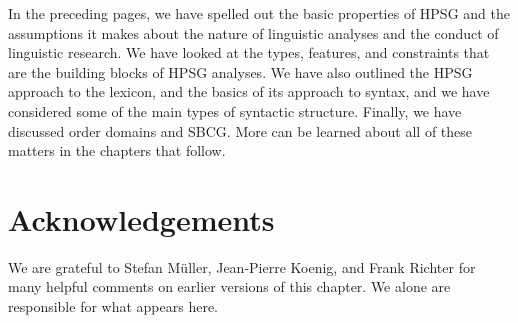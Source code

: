 \documentclass[output=paper
	        ,collection
	        ,collectionchapter
 	        ,biblatex
                ,babelshorthands
                ,newtxmath
                ,draftmode
                ,colorlinks, citecolor=brown
]{langscibook}
\begin{document}
In the preceding pages, we have spelled out the basic properties of HPSG and the assumptions it makes about the nature of linguistic analyses and the conduct of linguistic research. We have looked at the types, features, and constraints that are the building blocks of HPSG analyses. We have also outlined the HPSG approach to the lexicon, and the basics of its approach to syntax, and we have considered some of the main types of syntactic structure. Finally, we have discussed order domains and SBCG. More can be learned about all of these matters in the chapters that follow.


\section*{Acknowledgements}

We are grateful to Stefan Müller, Jean-Pierre Koenig, and Frank Richter for many helpful comments on
earlier versions of this chapter. We alone are responsible for what appears here.



{\sloppy
\printbibliography[heading=subbibliography,notkeyword=this]
}
\end{document}
